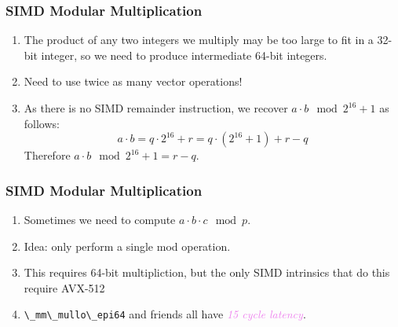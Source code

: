\documentclass{beamer}
\newcommand{\its}[1]{\textcolor{violet}{\emph{#1}}}
\begin{document}
\begin{frame}
    \frametitle{SIMD Modular Multiplication}

    \begin{enumerate}[label=(\roman*)]
        \item The product of any two integers we multiply may be too large to
            fit in a 32-bit integer, so we need to produce intermediate 64-bit
            integers. \pause \medbreak

        \item Need to use twice as many vector operations! \pause \medbreak

        \item As there is no SIMD remainder instruction, we recover
            $a \cdot b \mod 2^{16} + 1$ as follows:
            $$
                a \cdot b = q \cdot 2^{16} + r = q \cdot (2^{16} + 1) + r - q
            $$
            \pause Therefore $a \cdot b \mod 2^{16} + 1 = r - q$.
    \end{enumerate}
\end{frame}

\begin{frame}
    \frametitle{SIMD Modular Multiplication}

    \begin{enumerate}[label=(\roman*)]
        \item Sometimes we need to compute $a \cdot b \cdot c \mod p$.
            \pause \medbreak

        \item Idea: only perform a single mod operation. \pause \medbreak

        \item This requires 64-bit multipliction, but the only SIMD intrinsics
            that do this require AVX-512 \pause \medbreak

        \item \lstinline{\_mm\_mullo\_epi64} and friends all have
            \its{15 cycle latency}.
    \end{enumerate}
\end{frame}
\end{document}
